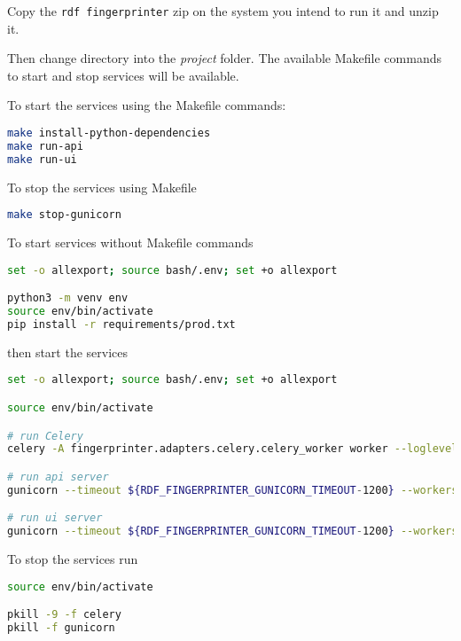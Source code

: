 Copy the \texttt{rdf fingerprinter} zip on the system you intend to run it and unzip it.

Then change directory into the \textit{project} folder. The available Makefile commands to start and stop services will be available.

To start the services using the Makefile commands:

\begin{lstlisting}[language=bash,]
make install-python-dependencies
make run-api
make run-ui
\end{lstlisting}

To stop the services using Makefile

\begin{lstlisting}[language=bash,]
make stop-gunicorn
\end{lstlisting}

To start services without Makefile commands

\begin{lstlisting}[language=bash,]
set -o allexport; source bash/.env; set +o allexport

python3 -m venv env
source env/bin/activate
pip install -r requirements/prod.txt
\end{lstlisting}

then start the services

\begin{lstlisting}[language=bash,]
set -o allexport; source bash/.env; set +o allexport

source env/bin/activate

# run Celery
celery -A fingerprinter.adapters.celery.celery_worker worker --loglevel ${RDF_FINGERPRINTER_LOG_LEVEL} --logfile ${RDF_FINGERPRINTER_CELERY_LOGS} --detach

# run api server
gunicorn --timeout ${RDF_FINGERPRINTER_GUNICORN_TIMEOUT-1200} --workers ${RDF_FINGERPRINTER_GUNICORN_API_WORKERS-2} --bind 0.0.0.0:${RDF_FINGERPRINTER_API_PORT} --reload --log-file ${RDF_FINGERPRINTER_API_LOGS} --log-level ${RDF_FINGERPRINTER_LOG_LEVEL} fingerprinter.entrypoints.api.run:app --daemon

# run ui server
gunicorn --timeout ${RDF_FINGERPRINTER_GUNICORN_TIMEOUT-1200} --workers ${RDF_FINGERPRINTER_GUNICORN_UI_WORKERS-1} --bind 0.0.0.0:${RDF_FINGERPRINTER_UI_PORT} --reload --log-file ${RDF_FINGERPRINTER_UI_LOGS} --log-level ${RDF_FINGERPRINTER_LOG_LEVEL} fingerprinter.entrypoints.ui.run:app --daemon
\end{lstlisting}

To stop the services run

\begin{lstlisting}[language=bash,]
source env/bin/activate

pkill -9 -f celery
pkill -f gunicorn
\end{lstlisting}